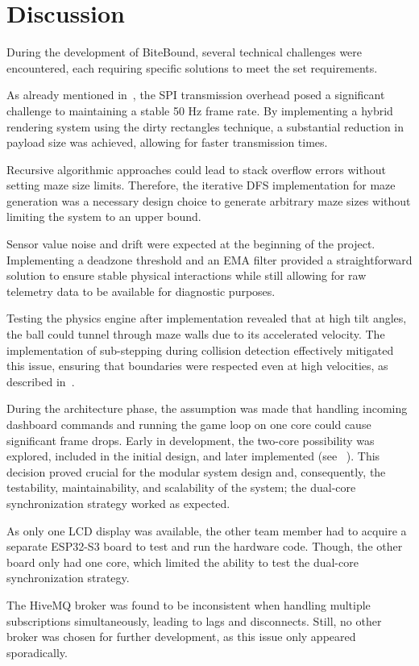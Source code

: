 \section{Discussion}
\label{sec:discussion}

During the development of BiteBound, several technical challenges were encountered, each requiring specific solutions to meet the set requirements.

As already mentioned in~, the SPI transmission overhead posed a significant challenge to maintaining a stable 50 Hz frame rate. By implementing a hybrid rendering system using the dirty rectangles technique, a substantial reduction in payload size was achieved, allowing for faster transmission times.

Recursive algorithmic approaches could lead to stack overflow errors without setting maze size limits. Therefore, the iterative DFS implementation for maze generation was a necessary design choice to generate arbitrary maze sizes without limiting the system to an upper bound.

Sensor value noise and drift were expected at the beginning of the project. Implementing a deadzone threshold and an EMA filter provided a straightforward solution to ensure stable physical interactions while still allowing for raw telemetry data to be available for diagnostic purposes.

Testing the physics engine after implementation revealed that at high tilt angles, the ball could tunnel through maze walls due to its accelerated velocity. The implementation of sub-stepping during collision detection effectively mitigated this issue, ensuring that boundaries were respected even at high velocities, as described in~.

During the architecture phase, the assumption was made that handling incoming dashboard commands and running the game loop on one core could cause significant frame drops. Early in development, the two-core possibility was explored, included in the initial design, and later implemented (see ~). This decision proved crucial for the modular system design and, consequently, the testability, maintainability, and scalability of the system; the dual-core synchronization strategy worked as expected.

As only one LCD display was available, the other team member had to acquire a separate ESP32-S3 board to test and run the hardware code. Though, the other board only had one core, which limited the ability to test the dual-core synchronization strategy.

The HiveMQ broker was found to be inconsistent when handling multiple subscriptions simultaneously, leading to lags and disconnects. Still, no other broker was chosen for further development, as this issue only appeared sporadically.